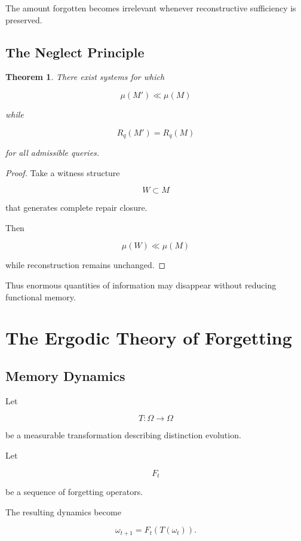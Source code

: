 \documentclass[12pt,oneside]{book}
\theoremstyle{plain} \newtheorem{theorem}{Theorem}[chapter] \newtheorem{lemma}[theorem]{Lemma} \newtheorem{proposition}[theorem]{Proposition} \newtheorem{corollary}[theorem]{Corollary}
\theoremstyle{definition} \newtheorem{definition}[theorem]{Definition} \newtheorem{axiom}[theorem]{Axiom} \newtheorem{construction}[theorem]{Construction}
\theoremstyle{remark} \newtheorem{remark}[theorem]{Remark} \newtheorem{example}[theorem]{Example}
\begin{document}
The amount forgotten becomes irrelevant whenever reconstructive sufficiency is preserved.

\section{The Neglect Principle}

\begin{theorem}

There exist systems for which

\[
\mu(M')
\ll
\mu(M)
\]

while

\[
R_q(M')
=
R_q(M)
\]

for all admissible queries.

\end{theorem}

\begin{proof}

Take a witness structure

\[
W
\subset M
\]

that generates complete repair closure.

Then

\[
\mu(W)
\ll
\mu(M)
\]

while reconstruction remains unchanged.

\end{proof}

Thus enormous quantities of information may disappear without reducing functional memory.

\chapter{The Ergodic Theory of Forgetting}

\section{Memory Dynamics}

Let

\[
T:\Omega\rightarrow\Omega
\]

be a measurable transformation describing distinction evolution.

Let

\[
F_t
\]

be a sequence of forgetting operators.

The resulting dynamics become

\[
\omega_{t+1}
=
F_t(T(\omega_t)).
\]
\end{document}
